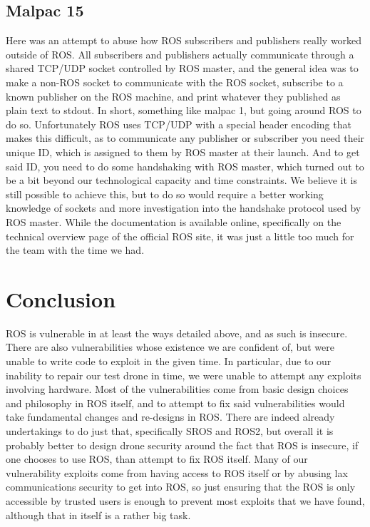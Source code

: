 \documentclass[IEEEtran,letterpaper,10pt,notitlepage,draftclsnofoot,onecolumn]{article}
\begin{document}
\subsection{Malpac 15}
Here was an attempt to abuse how ROS subscribers and publishers really worked outside of ROS. 
All subscribers and publishers actually communicate through a shared TCP/UDP socket controlled by ROS master, and the general idea was to make a non-ROS socket to communicate with the ROS socket, subscribe to a known publisher on the ROS machine, and print whatever they published as plain text to stdout. 
In short, something like malpac 1, but going around ROS to do so. Unfortunately ROS uses TCP/UDP with a special header encoding that makes this difficult, as to communicate any publisher or subscriber you need their unique ID, which is assigned to them by ROS master at their launch. 
And to get said ID, you need to do some handshaking with ROS master, which turned out to be a bit beyond our technological capacity and time constraints. 
We believe it is still possible to achieve this, but to do so would require a better working knowledge of sockets and more investigation into the handshake protocol used by ROS master. 
While the documentation is available online, specifically on the technical overview page of the official ROS site\cite{ROS}, it was just a little too much for the team with the time we had.

\section{Conclusion}
ROS is vulnerable in at least the ways detailed above, and as such is insecure. 
There are also vulnerabilities whose existence we are confident of, but were unable to write code to exploit in the given time. 
In particular, due to our inability to repair our test drone in time, we were unable to attempt any exploits involving hardware. 
Most of the vulnerabilities come from basic design choices and philosophy in ROS itself, and to attempt to fix said vulnerabilities would take fundamental changes and re-designs in ROS. 
There are indeed already undertakings to do just that, specifically SROS and ROS2, but overall it is probably better to design drone security around the fact that ROS is insecure, if one chooses to use ROS, than attempt to fix ROS itself. 
Many of our vulnerability exploits come from having access to ROS itself or by abusing lax communications security to get into ROS, so just ensuring that the ROS is only accessible by trusted users is enough to prevent most exploits that we have found, although that in itself is a rather big task.
\end{document}
